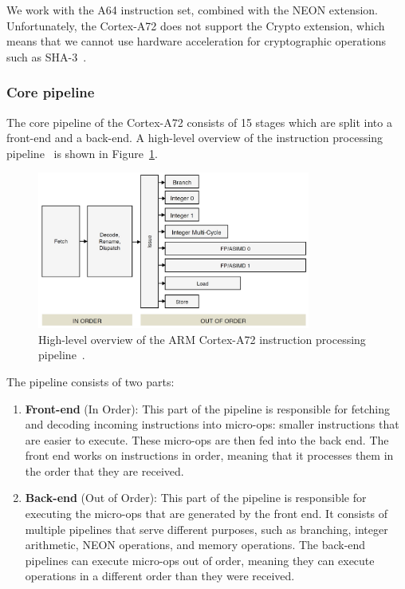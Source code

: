\documentclass[11pt,a4paper]{report}
\theoremstyle{definition}
\begin{document}
We work with the A64 instruction set, combined with the NEON extension. Unfortunately, the Cortex-A72 does not support the Crypto extension, which means that we cannot use hardware acceleration for cryptographic operations such as SHA-3~\cite{dworkin2015sha}.

\subsubsection{Core pipeline}
The core pipeline of the Cortex-A72 consists of 15 stages which are split into a front-end and a back-end. A high-level overview of the instruction processing pipeline~\cite{CortexA72OptGuide} is shown in Figure~\ref{fig:cortexa72pipeline}.

\begin{figure}
  \centering
  \includegraphics[width=0.8\textwidth]{armv8/Cortex-A72-pipeline-simplified.jpg}
  \caption{High-level overview of the ARM Cortex-A72 instruction processing pipeline~\cite{CortexA72OptGuide}.}
  \label{fig:cortexa72pipeline}
\end{figure}

The pipeline consists of two parts:
\begin{enumerate}
  \item \textbf{Front-end} (In Order): This part of the pipeline is responsible for fetching and decoding incoming instructions into micro-ops: smaller instructions that are easier to execute. These micro-ops are then fed into the back end. The front end works on instructions in order, meaning that it processes them in the order that they are received.
  \item \textbf{Back-end} (Out of Order): This part of the pipeline is responsible for executing the micro-ops that are generated by the front end. It consists of multiple pipelines that serve different purposes, such as branching, integer arithmetic, NEON operations, and memory operations. The back-end pipelines can execute micro-ops out of order, meaning they can execute operations in a different order than they were received.
\end{enumerate}
\end{document}
